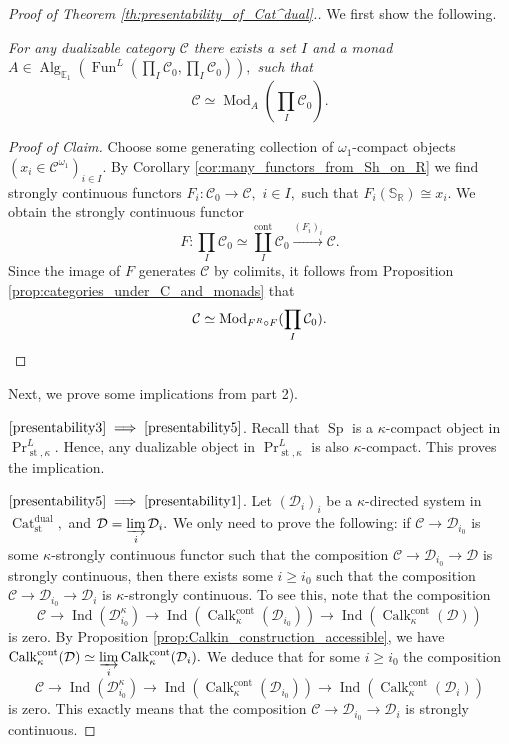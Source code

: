 \documentclass[11pt,leqno]{amsart}
\newcommand{\Implies}[2]{$\text{\ref{#1}}\implies\text{\ref{#2}}$}
\numberwithin{equation}{section}
\def\R{\mathbb{R}}
\def\bS{\mathbb{S}}
\newcommand{\indlim}[1][]{\mathop{\varinjlim}\limits_{#1}}
\newcommand{\xto}{\xrightarrow}
\newcommand{\Cat}{\operatorname{Cat}}
\newcommand{\cont}{\operatorname{cont}}
\newcommand{\st}{\operatorname{st}}
\newcommand{\dual}{\operatorname{dual}}
\newcommand{\bE}{{\mathbb E}}
\newcommand{\cD}{{\mathcal D}}
\newcommand{\cC}{{\mathcal C}}
\newcommand{\Fun}{\operatorname{Fun}}
\newcommand{\Sp}{\operatorname{Sp}}
\newcommand{\Ind}{\operatorname{Ind}}
\newcommand{\Calk}{\operatorname{Calk}}
\newcommand{\Alg}{\operatorname{Alg}}
\newcommand{\Mod}{\operatorname{Mod}}
\begin{document}
\begin{proof}[Proof of Theorem \ref{th:presentability_of_Cat^dual}.] We first show the following.

{} {\it For any dualizable category $\cC$ there exists a set $I$ and a monad $A\in\Alg_{\bE_1}(\Fun^{L}(\prod\limits_I\cC_0,\prod\limits_I\cC_0)),$ such that $$\cC\simeq\Mod_A(\prod\limits_I\cC_0).$$}

\begin{proof}[Proof of Claim] Choose some generating collection of $\omega_1$-compact objects $(x_i\in\cC^{\omega_1})_{i\in I}.$ By Corollary \ref{cor:many_functors_from_Sh_on_R} we find strongly continuous functors $F_i:\cC_0\to\cC,$ $i\in I,$ such that $F_i(\bS_{\R})\cong x_i.$ We obtain the strongly continuous functor
$$F:\prod\limits_I\cC_0\simeq\coprod\limits_I^{\cont}\cC_0\xto{(F_i)_i}\cC.$$
Since the image of $F$ generates $\cC$ by colimits, it follows from Proposition \ref{prop:categories_under_C_and_monads} that 
\begin{equation*}
\cC\simeq\Mod_{F^R\circ F}(\prod\limits_I\cC_0).\qedhere\end{equation*} 
\end{proof}

Next, we prove some implications from part 2). 

\Implies{presentability3}{presentability5}. Recall that $\Sp$ is a $\kappa$-compact object in $\Pr^L_{\st,\kappa}.$ Hence, any dualizable object in $\Pr^L_{\st,\kappa}$ is also $\kappa$-compact. This proves the implication.

\Implies{presentability5}{presentability1}. Let $(\cD_i)_i$ be a $\kappa$-directed system in $\Cat_{\st}^{\dual},$ and $\cD=\indlim[i]\cD_i.$ We only need to prove the following: if $\cC\to\cD_{i_0}$ is some $\kappa$-strongly continuous functor such that the composition $\cC\to\cD_{i_0}\to\cD$ is strongly continuous, then there exists some $i\geq i_0$ such that the composition $\cC\to\cD_{i_0}\to\cD_i$ is $\kappa$-strongly continuous. To see this, note that the composition $$\cC\to\Ind(\cD_{i_0}^{\kappa})\to \Ind(\Calk_{\kappa}^{\cont}(\cD_{i_0}))\to \Ind(\Calk_{\kappa}^{\cont}(\cD))$$
is zero. By Proposition \ref{prop:Calkin_construction_accessible}, we have $\Calk_{\kappa}^{\cont}(\cD)\simeq\indlim[i]\Calk_{\kappa}^{\cont}(\cD_i).$ We deduce that for some $i\geq i_0$ the composition
$$\cC\to\Ind(\cD_{i_0}^{\kappa})\to \Ind(\Calk_{\kappa}^{\cont}(\cD_{i_0}))\to \Ind(\Calk_{\kappa}^{\cont}(\cD_i))$$ is zero. This exactly means that the composition $\cC\to\cD_{i_0}\to\cD_i$ is strongly continuous.


\end{proof}
\end{document}
